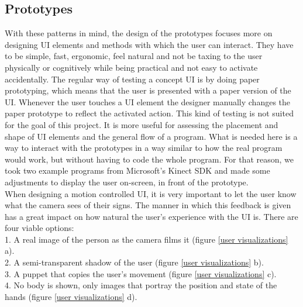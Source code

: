 \subsection{Prototypes}

With these patterns in mind, the design of the prototypes focuses more on designing UI elements and methods with which the user can interact. They have to be simple, fast, ergonomic, feel natural and not be taxing to the user physically or cognitively while being practical and not easy to activate accidentally. The regular way of testing a concept UI is by doing paper prototyping, which means that the user is presented with a paper version of the UI. Whenever the user touches a UI element the designer manually changes the paper prototype to reflect the activated action. This kind of testing is not suited for the goal of this project. It is more useful for assessing the placement and shape of UI elements and the general flow of a program. What is needed here is a way to interact with the prototypes in a way similar to how the real program would work, but without having to code the whole program. For that reason, we took two example programs from Microsoft's Kinect SDK and made some adjustments to display the user on-screen, in front of the prototype.\\

When designing a motion controlled UI, it is very important to let the user know what the camera sees of their signs. The manner in which this feedback is given has a great impact on how natural the user's experience with the UI is. There are four viable options:\\

 1. A real image of the person as the camera films it (figure \ref{user visualizations} a).\\
 2. A semi-transparent shadow of the user (figure \ref{user visualizations} b).\\
 3. A puppet that copies the user's movement (figure \ref{user visualizations} c).\\
 4. No body is shown, only images that portray the position and state of the hands (figure \ref{user visualizations} d).\\
 
